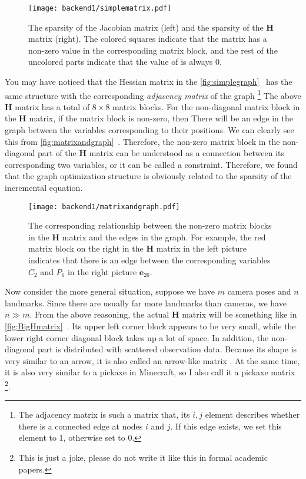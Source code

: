\begin{figure}[!t]
	\centering
	\texttt{[image: backend1/simplematrix.pdf]}
	\caption{The sparsity of the Jacobian matrix (left) and the sparsity of the $\mathbf{H}$ matrix (right). The colored squares indicate that the matrix has a non-zero value in the corresponding matrix block, and the rest of the uncolored parts indicate that the value of is always 0.}
	\label{fig:simplematrix}
\end{figure}

You may have noticed that the Hessian matrix in the \autoref{fig:simplegraph}~ has the same structure with the corresponding \textit{adjacency matrix} of the graph \footnote{The adjacency matrix is such a matrix that, its $i,j$ element describes whether there is a connected edge at nodes $i$ and $j$. If this edge exists, we set this element to 1, otherwise set to 0.} The above $\mathbf{H}$ matrix has a total of $8 \times 8$ matrix blocks. For the non-diagonal matrix block in the $\mathbf{H}$ matrix, if the matrix block is non-zero, then There will be an edge in the graph between the variables corresponding to their positions. We can clearly see this from \autoref{fig:matrixandgraph}~. Therefore, the non-zero matrix block in the non-diagonal part of the $\mathbf{H}$ matrix can be understood as a connection between its corresponding two variables, or it can be called a constraint. Therefore, we found that the graph optimization structure is obviously related to the sparsity of the incremental equation.

\begin{figure}[!htp]
	\centering
	\texttt{[image: backend1/matrixandgraph.pdf]}
	\caption{The corresponding relationship between the non-zero matrix blocks in the $\mathbf{H}$ matrix and the edges in the graph. For example, the red matrix block on the right in the $\mathbf{H}$ matrix in the left picture indicates that there is an edge between the corresponding variables $C_2$ and $P_6$ in the right picture $\mathbf{e}_{26} $.}
	\label{fig:matrixandgraph}
\end{figure}

Now consider the more general situation, suppose we have $m$ camera poses and $n$ landmarks. Since there are usually far more landmarks than cameras, we have $n \gg m$. From the above reasoning, the actual $\mathbf{H}$ matrix will be something like in \autoref{fig:BigHmatrix}~. Its upper left corner block appears to be very small, while the lower right corner diagonal block takes up a lot of space. In addition, the non-diagonal part is distributed with scattered observation data. Because its shape is very similar to an arrow, it is also called an arrow-like matrix {\cite{Barfoot2016}}. At the same time, it is also very similar to a pickaxe in Minecraft, so I also call it a pickaxe matrix \footnote{This is just a joke, please do not write it like this in formal academic papers. }.

